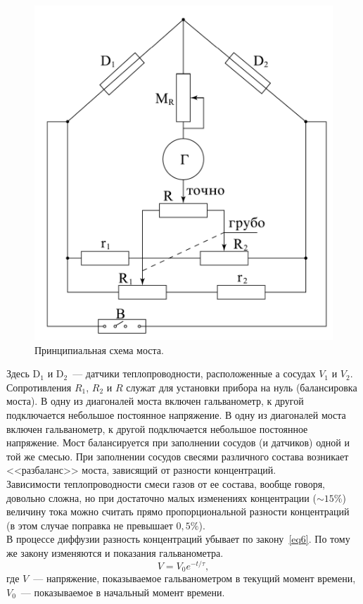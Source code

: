 \documentclass[a4paper,11pt]{article}
\begin{document}
\begin{figure}\label{fig:img2}
  \centering
  \includegraphics[scale = 0.2]{scheme2.png}
  \caption{Принципиальная схема моста.}
\end{figure}
Здесь D$_{1}$ и D$_{2}$~--- датчики теплопроводности, расположенные а сосудах $V_{1}$ и $V_{2}$. Сопротивления $R_{1}$, $R_{2}$ и $R$ служат для установки прибора на нуль (балансировка моста). В одну из диагоналей моста включен гальванометр, к другой подключается небольшое постоянное напряжение. В одну из диагоналей моста включен гальванометр, к другой подключается небольшое постоянное напряжение. Мост балансируется при заполнении сосудов (и датчиков) одной и той же смесью. При заполнении сосудов свесями различного состава возникает <<разбаланс>> моста, зависящий от разности концентраций.\\
Зависимости теплопроводности смеси газов от ее состава, вообще говоря, довольно сложна, но при достаточно малых изменениях концентрации ($\sim 15\%$) величину тока можно считать прямо пропорциональной разности концентраций (в этом случае поправка не превышает $0,5\%$).\\
В процессе диффузии разность концентраций убывает по закону~\ref{eq6}. По тому же закону изменяются и показания гальванометра.
\begin{equation}\label{eq9}
  V = V_{0} e^{-t/\tau},
\end{equation}
где $V$~--- напряжение, показываемое гальванометром в текущий момент времени, $V_{0}$~--- показываемое в начальный момент времени.
\end{document}
